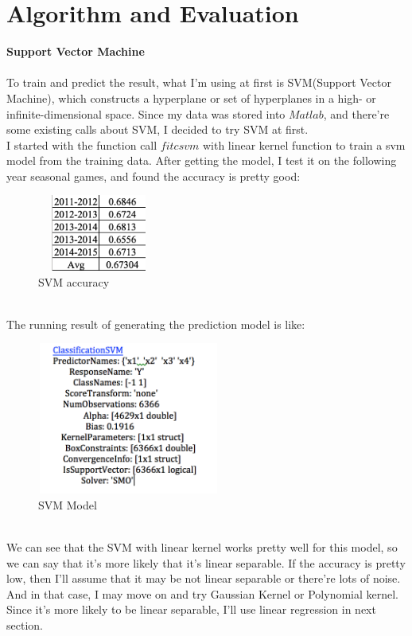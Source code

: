 \documentclass{article}
\begin{document}
 \section {Algorithm and Evaluation}
 \textbf{Support Vector Machine}
 \\
 \\
 To train and predict the result, what I'm using at first is SVM(Support Vector Machine), which constructs a hyperplane or set of hyperplanes in a high- or infinite-dimensional space. Since my data was stored into $Matlab$, and there're some existing calls about SVM, I decided to try SVM at first.
 \\
 I started with the function call $fitcsvm$ with linear kernel function to train a svm model from the training data. 
 After getting the model, I test it on the following year seasonal games, and found the accuracy is pretty good:
  \begin{figure}[htbp]
 \centering
 \includegraphics[width=4cm, height=2.5cm]{svmresult}
  \caption{SVM accuracy}
\end{figure}
\\
The running result of generating the prediction model is like:
 \begin{figure}[htbp]
 \centering
 \includegraphics[width=6cm, height=5cm]{svm}
  \caption{SVM Model}
\end{figure}
\\
We can see that the SVM with linear kernel works pretty well for this model, so we can say that it's more likely that it's linear separable. If the accuracy is pretty low, then I'll assume that it may be not linear separable or there're lots of noise. And in that case, I may move on and try Gaussian Kernel or Polynomial kernel. Since it's more likely to be linear separable, I'll use linear regression in next section.
\end{document}
